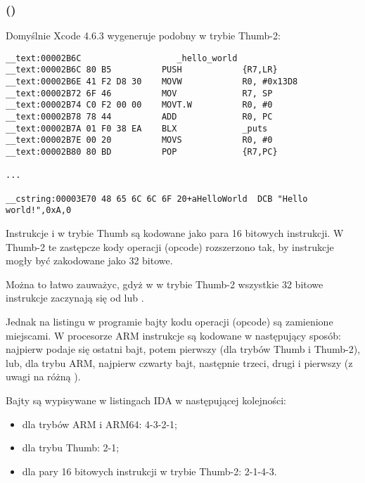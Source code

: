 \subsubsection{\OptimizingXcodeIV (\ThumbTwoMode)}

Domyślnie Xcode 4.6.3 wygeneruje podobny w trybie Thumb-2:

\begin{lstlisting}[caption=\OptimizingXcodeIV (\ThumbTwoMode),style=customasmARM]
__text:00002B6C                   _hello_world
__text:00002B6C 80 B5          PUSH            {R7,LR}
__text:00002B6E 41 F2 D8 30    MOVW            R0, #0x13D8
__text:00002B72 6F 46          MOV             R7, SP
__text:00002B74 C0 F2 00 00    MOVT.W          R0, #0
__text:00002B78 78 44          ADD             R0, PC
__text:00002B7A 01 F0 38 EA    BLX             _puts
__text:00002B7E 00 20          MOVS            R0, #0
__text:00002B80 80 BD          POP             {R7,PC}

...

__cstring:00003E70 48 65 6C 6C 6F 20+aHelloWorld  DCB "Hello world!",0xA,0
\end{lstlisting}


\myindex{\ThumbTwoMode}
Instrukcje  i  w trybie Thumb są kodowane jako para 16 bitowych instrukcji.
W Thumb-2 te zastępcze kody operacji (opcode) rozszerzono tak, by instrukcje mogły być zakodowane jako 32 bitowe.

Można to łatwo zauważyc, gdyż w w trybie Thumb-2 wszystkie 32 bitowe instrukcje zaczynają się od  lub .

Jednak na listingu w programie \IDA bajty kodu operacji (opcode) są zamienione miejscami.
W procesorze ARM instrukcje są kodowane w następujący sposób:
najpierw podaje się ostatni bajt, potem pierwszy (dla trybów Thumb i Thumb-2), lub, dla trybu ARM, najpierw czwarty bajt, następnie trzeci, drugi i pierwszy
(z uwagi na różną ).

Bajty są wypisywane w listingach IDA w następującej kolejności:

\begin{itemize}
\item dla trybów ARM i ARM64: 4-3-2-1;
\item dla trybu Thumb: 2-1;
\item dla pary 16 bitowych instrukcji w trybie Thumb-2: 2-1-4-3.
\end{itemize}

